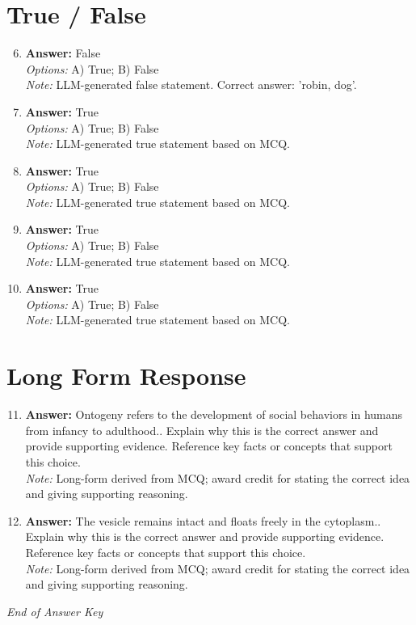 \documentclass[12pt]{article}
\begin{document}
\section*{True / False}
\begin{enumerate}[label=\arabic*.]
\setcounter{enumi}{5}
\item \textbf{Answer:} False
\\ \textit{Options:} A) True; B) False
\\ \textit{Note:} LLM-generated false statement. Correct answer: 'robin, dog'.
\item \textbf{Answer:} True
\\ \textit{Options:} A) True; B) False
\\ \textit{Note:} LLM-generated true statement based on MCQ.
\item \textbf{Answer:} True
\\ \textit{Options:} A) True; B) False
\\ \textit{Note:} LLM-generated true statement based on MCQ.
\item \textbf{Answer:} True
\\ \textit{Options:} A) True; B) False
\\ \textit{Note:} LLM-generated true statement based on MCQ.
\item \textbf{Answer:} True
\\ \textit{Options:} A) True; B) False
\\ \textit{Note:} LLM-generated true statement based on MCQ.
\end{enumerate}

\section*{Long Form Response}
\begin{enumerate}[label=\arabic*.]
\setcounter{enumi}{10}
\item \textbf{Answer:} Ontogeny refers to the development of social behaviors in humans from infancy to adulthood.. Explain why this is the correct answer and provide supporting evidence. Reference key facts or concepts that support this choice.
\\ \textit{Note:} Long-form derived from MCQ; award credit for stating the correct idea and giving supporting reasoning.
\item \textbf{Answer:} The vesicle remains intact and floats freely in the cytoplasm.. Explain why this is the correct answer and provide supporting evidence. Reference key facts or concepts that support this choice.
\\ \textit{Note:} Long-form derived from MCQ; award credit for stating the correct idea and giving supporting reasoning.
\end{enumerate}

\vfill
\noindent\textit{End of Answer Key}
\end{document}
